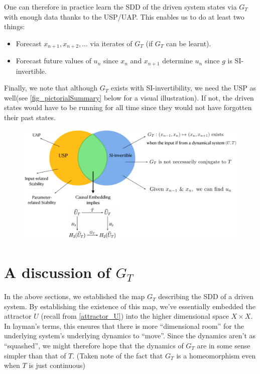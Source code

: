 \documentclass[a4paper,12pt,twoside]{report}
\begin{document}
One can therefore in practice learn the SDD of the driven system states via $G_T$ with enough data thanks to the USP/UAP. This enables us to do at least two things: 
\vspace{-8mm}
\begin{itemize}
\item Forecast  $x_{n+1},x_{n+2}, \ldots$ via iterates of $G_T$ (if $G_T$ can be learnt).
\item Forecast future values of $u_n$ since $x_n$ and $x_{n+1}$ determine $u_n$ since $g$ is SI-invertible. 
\end{itemize} 


Finally, we note that although $G_T$ exists with SI-invertibility, we need the USP as well(see \ref{fig_pictorialSummary} below for a visual illustration). If not, the driven states would have to be running for all time since they would not have forgotten their past states. 

\begin{figure}[ht]
  \includegraphics[scale=0.3]{_summarypictorial.eps}
  \centering
  \label{fig:fig_pictorialSummary}
\end{figure}


\section{A discussion of $G_T$ }

In the above sections, we established the map $G_T$ describing the SDD of a driven system. By establishing the existence of this map, we’ve essentially embedded the attractor $U$ (recall from \ref{attractor_U}) into the higher dimensional space $X\times{X}$.
In layman’s terms, this ensures that there is more “dimensional room” for the underlying system’s underlying dynamics to “move”. Since the dynamics aren’t as “squashed”, we might therefore hope that the dynamics of $G_T$ are in some sense simpler than that of $T$. (Taken note of the fact that $G_T$ is a homeomorphism even when $T$ is just continuous)
 
\end{document}
